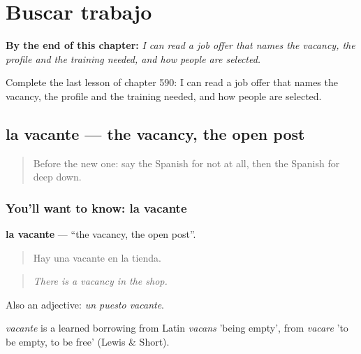 
\chapter{Buscar trabajo}
\label{ch:es-buscar-trabajo}

\begin{chapteropening}
\textbf{By the end of this chapter:} \emph{I can read a job offer that names the vacancy, the profile and the training needed, and how people are selected.}

Complete the last lesson of chapter 590: I can read a job offer that names the vacancy, the profile and the training needed, and how people are selected.
\end{chapteropening}

\section[la vacante]{la vacante — the vacancy, the open post}

\label{lesson:ES-C590-vacante}



\begin{quote}
Before the new one: say the Spanish for not at all, then the Spanish for deep down.
\end{quote}

\subsection*{You'll want to know: la vacante}
\textbf{la vacante} — \textquotedblleft{}the vacancy, the open post\textquotedblright{}.

\begin{quote}
Hay una vacante en la tienda.
\end{quote}

\begin{quote}
\emph{There is a vacancy in the shop.}
\end{quote}

Also an adjective: \emph{un puesto vacante}.

\begin{cousinweb}
\emph{vacante} is a learned borrowing from Latin \emph{vacans} 'being empty', from \emph{vacare} 'to be empty, to be free' (Lewis \& Short).
\end{cousinweb}

